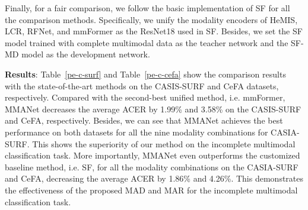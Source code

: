 \documentclass[10pt,twocolumn,letterpaper]{article}
\begin{document}
Finally, for a fair comparison, we follow the basic implementation of SF for all the comparison methods. Specifically, we unify the modality encoders of HeMIS, LCR, RFNet, and mmFormer as the ResNet18 used in SF. Besides, we set the SF model trained with complete multimodal data as the teacher network and the SF-MD model as the development network.







\textbf{Results}: Table~\ref{pe-c-surf} and Table~\ref{pe-c-cefa} show the comparison results with the state-of-the-art methods on the CASIS-SURF and CeFA datasets, respectively. Compared with the second-best unified method, i.e. mmFormer, MMANet decreases the average ACER by 1.99\% and 3.58\% on the CASIS-SURF and CeFA, respectively. Besides, we can see that MMANet achieves the best performance on both datasets for all the nine modality combinations for CASIA-SURF. This shows the superiority of our method on the incomplete multimodal classification task. More importantly, MMANet even outperforms the customized baseline method, i.e. SF, for all the modality combinations on the CASIA-SURF and CeFA, decreasing the average ACER by 1.86\% and 4.26\%. This demonstrates the effectiveness of the proposed MAD and MAR for the incomplete multimodal classification task.
\end{document}
